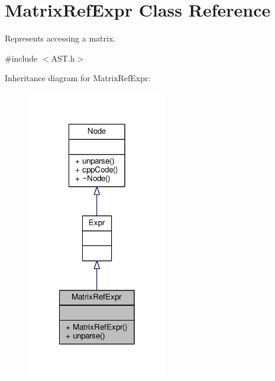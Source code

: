 \hypertarget{classMatrixRefExpr}{\section{Matrix\-Ref\-Expr Class Reference}
\label{classMatrixRefExpr}
}


Represents accessing a matrix. \par
  




{\ttfamily \#include $<$A\-S\-T.\-h$>$}



Inheritance diagram for Matrix\-Ref\-Expr\-:\nopagebreak
\begin{figure}[H]
\begin{center}
\leavevmode
\includegraphics[width=174pt]{classMatrixRefExpr__inherit__graph}
\end{center}
\end{figure}


